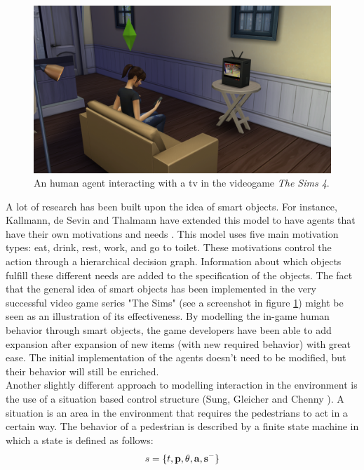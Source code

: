 \documentclass[11pt, a4paper]{book}
\begin{document}
\begin{figure}[h]
\centering
\includegraphics[width=.6\textwidth]{./thesims.png}
\caption{An human agent interacting with a tv in the videogame \emph{The Sims 4}.}
\label{fig:thesims}
\end{figure}

A lot of research has been built upon the idea of smart objects. For instance, Kallmann, de Sevin and Thalmann have extended this model to have agents that have their own motivations and needs \cite{Kallmann00constructingvirtual}. This model uses five main motivation types: eat, drink, rest, work, and go to toilet. These motivations control the action through a hierarchical decision graph. Information about which objects fulfill these different needs are added to the specification of the objects.
The fact that the general idea of smart objects has been implemented in the very successful video game series "The Sims" (see a screenshot in figure \ref{fig:thesims}) might be seen as an illustration of its effectiveness. By modelling the in-game human behavior through smart objects, the game developers have been able to add expansion after expansion of new items (with new required behavior) with great ease. The initial implementation of the agents doesn't need to be modified, but their behavior will still be enriched. \\
Another slightly different approach to modelling interaction in the environment is the use of a situation based control structure (Sung, Gleicher and Chenny \cite{Sung04scalablebehaviors}). A situation is an area in the environment that requires the pedestrians to act in a certain way. The behavior of a pedestrian is described by a finite state machine in which a state is defined as follows:
 \[s = \{t, \bf{p}, \theta, a, s^- \}\]
\end{document}
